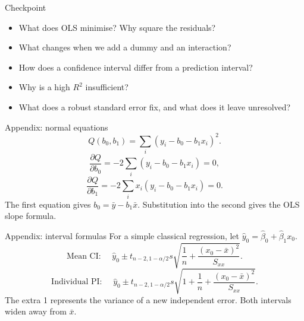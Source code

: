 \begin{frame}{Checkpoint}
\begin{itemize}
\item What does OLS minimise? Why square the residuals?
\item What changes when we add a dummy and an interaction?
\item How does a confidence interval differ from a prediction interval?
\item Why is a high $R^2$ insufficient?
\item What does a robust standard error fix, and what does it leave unresolved?
\end{itemize}
\end{frame}

\begin{frame}{Appendix: normal equations}
\[Q(b_0,b_1)=\sum_i(y_i-b_0-b_1x_i)^2.\]\[\frac{\partial Q}{\partial b_0}=-2\sum_i(y_i-b_0-b_1x_i)=0,\]\[\frac{\partial Q}{\partial b_1}=-2\sum_ix_i(y_i-b_0-b_1x_i)=0.\]The first equation gives $b_0=\bar y-b_1\bar x$. Substitution into the second gives the OLS slope formula.
\end{frame}

\begin{frame}{Appendix: interval formulas}
For a simple classical regression, let $\hat y_0=\hat\beta_0+\hat\beta_1x_0$.\[\text{Mean CI: }\quad \hat y_0\pm t_{n-2,1-\alpha/2}s\sqrt{\frac1n+\frac{(x_0-\bar x)^2}{S_{xx}}}.\]\[\text{Individual PI: }\quad \hat y_0\pm t_{n-2,1-\alpha/2}s\sqrt{1+\frac1n+\frac{(x_0-\bar x)^2}{S_{xx}}}.\]The extra 1 represents the variance of a new independent error. Both intervals widen away from $\bar x$.
\end{frame}
